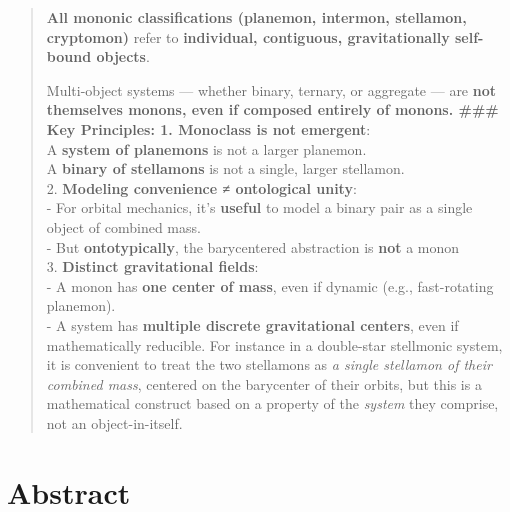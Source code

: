 \documentclass[
  letterpaper,
]{book}
\begin{document}
\begin{quote}
\textbf{All mononic classifications (planemon, intermon, stellamon,
cryptomon)} refer to \textbf{individual, contiguous, gravitationally
self-bound objects}.

Multi-object systems --- whether binary, ternary, or aggregate --- are
\textbf{not themselves monons, even if composed entirely of monons.
\#\#\# 🧠 Key Principles: 1. Monoclass is not emergent}:\\
A \textbf{system of planemons} is not a larger planemon.\\
A \textbf{binary of stellamons} is not a single, larger stellamon.\\
2. \textbf{Modeling convenience ≠ ontological unity}:\\
- For orbital mechanics, it's \textbf{useful} to model a binary pair as
a single object of combined mass.\\
- But \textbf{ontotypically}, the barycentered abstraction is
\textbf{not} a monon\\
3. \textbf{Distinct gravitational fields}:\\
- A monon has \textbf{one center of mass}, even if dynamic (e.g.,
fast-rotating planemon).\\
- A system has \textbf{multiple discrete gravitational centers}, even if
mathematically reducible. For instance in a double-star stellmonic
system, it is convenient to treat the two stellamons as \emph{a single
stellamon of their combined mass}, centered on the barycenter of their
orbits, but this is a mathematical construct based on a property of the
\emph{system} they comprise, not an object-in-itself.
\end{quote}

\chapter{Abstract}\label{abstract-39}
\end{document}
